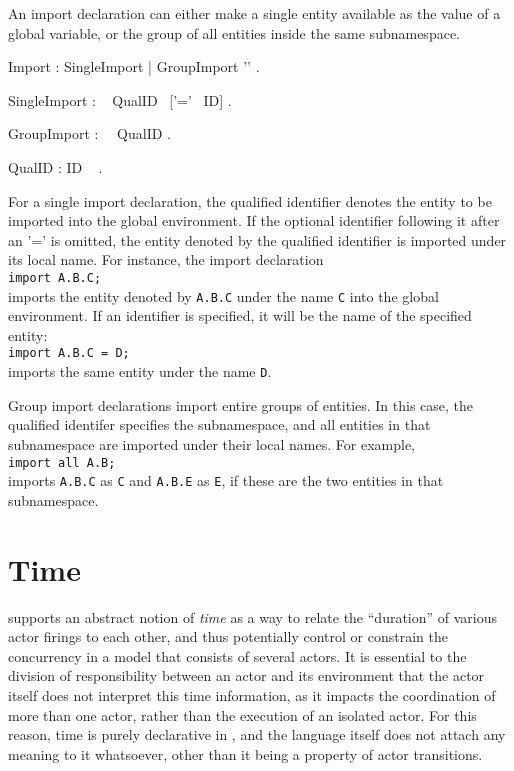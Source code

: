 An import declaration can either
make a single entity available as the value of a global variable, or
the group of all entities inside the same subnamespace.

\bgr
Import : SingleImport | GroupImport '\charSemi' .

SingleImport : \kwImport~ QualID ~['=' ~ID] .

GroupImport : \kwImport ~\kwAll ~QualID .

QualID : ID ~ .
\egr

For a single import declaration, the qualified identifier denotes the
entity to be imported into the global environment. If the optional
identifier following it after an '=' is omitted, the entity denoted
by the qualified identifier is imported under its local name. 
For instance, the import declaration\\
{\tt import A.B.C;}\\
imports the entity denoted by {\tt A.B.C} under the name {\tt C} into
the global environment. If an identifier is specified, it will be the
name of the specified entity:\\
{\tt import A.B.C = D;}\\
imports the same entity under the name {\tt D}.

Group import declarations import entire groups of entities. In this
case, the qualified identifer specifies the subnamespace, and all
entities in that subnamespace are imported under their local
names. For example,\\
{\tt import all A.B;}\\
imports {\tt A.B.C} as {\tt C} and {\tt A.B.E} as {\tt E}, if these
are the two entities in that subnamespace.


\section{Time}\label{sect:Time}



\Cal supports an abstract
notion of {\em time} as a way to relate the ``duration'' of various
actor firings to each other, and thus potentially control or constrain
the concurrency in a model that consists of several actors. It is
essential to the division of responsibility between an actor and its
environment that the actor itself does not interpret this time
information, as it impacts the coordination of more than one actor,
rather than the execution of an isolated actor. For this reason, time
is purely declarative in \Cal, and the language itself does not attach
any meaning to it whatsoever, other than it being a property of actor
transitions.

